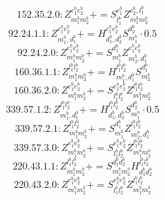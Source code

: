 \documentclass[letterpaper,10pt,fleqn,leqno,onecolumn]{article}
\begin{document}
\begin{equation} \;\;\;\;\;\;  152.35.2.0: Z^{e_{1}^{b}e_{2}^{b}}_{m_{1}^{b}m_{2}^{b}}+=S^{e_{1}^{b}}_{l_{1}^{b}}Z^{e_{2}^{b},l_{1}^{b}}_{m_{1}^{b}m_{2}^{b}} \end{equation}
\begin{equation} \;\;\;\;\;\;  92.24.1.1: Z^{e_{1}^{b}e_{2}^{b}}_{m_{1}^{b},d_{1}^{b}}+=H^{e_{1}^{b}e_{2}^{b}}_{d_{1}^{b},d_{2}^{b}}S^{d_{2}^{b}}_{m_{1}^{b}}\cdot 0.5 \end{equation}
\begin{equation} \;\;\;\;\;\;  92.24.2.0: Z^{e_{1}^{b}e_{2}^{b}}_{m_{1}^{b}m_{2}^{b}}+=S^{d_{1}^{b}}_{m_{1}^{b}}Z^{e_{1}^{b}e_{2}^{b}}_{m_{2}^{b},d_{1}^{b}} \end{equation}
\begin{equation} \;\;\;\;\;\;  160.36.1.1: Z^{l_{1}^{b}l_{2}^{b}}_{m_{1}^{b}m_{2}^{b}}+=H^{l_{1}^{b}l_{2}^{b}}_{m_{1}^{b},d_{1}^{b}}S^{d_{1}^{b}}_{m_{2}^{b}} \end{equation}
\begin{equation} \;\;\;\;\;\;  160.36.2.0: Z^{e_{1}^{b}e_{2}^{b}}_{m_{1}^{b}m_{2}^{b}}+=S^{e_{1}^{b}e_{2}^{b}}_{l_{1}^{b}l_{2}^{b}}Z^{l_{1}^{b}l_{2}^{b}}_{m_{1}^{b}m_{2}^{b}} \end{equation}
\begin{equation} \;\;\;\;\;\;  339.57.1.2: Z^{l_{1}^{b}l_{2}^{b}}_{m_{1}^{b},d_{1}^{b}}+=H^{l_{1}^{b}l_{2}^{b}}_{d_{1}^{b},d_{2}^{b}}S^{d_{2}^{b}}_{m_{1}^{b}}\cdot 0.5 \end{equation}
\begin{equation} \;\;\;\;\;\;  339.57.2.1: Z^{l_{1}^{b}l_{2}^{b}}_{m_{1}^{b}m_{2}^{b}}+=S^{d_{1}^{b}}_{m_{1}^{b}}Z^{l_{1}^{b}l_{2}^{b}}_{m_{2}^{b},d_{1}^{b}} \end{equation}
\begin{equation} \;\;\;\;\;\;  339.57.3.0: Z^{e_{1}^{b}e_{2}^{b}}_{m_{1}^{b}m_{2}^{b}}+=S^{e_{1}^{b}e_{2}^{b}}_{l_{1}^{b}l_{2}^{b}}Z^{l_{1}^{b}l_{2}^{b}}_{m_{1}^{b}m_{2}^{b}} \end{equation}
\begin{equation} \;\;\;\;\;\;  220.43.1.1: Z^{l_{1}^{b}l_{2}^{b}}_{m_{1}^{b}m_{2}^{b}}+=S^{d_{1}^{b}d_{2}^{b}}_{m_{1}^{b}m_{2}^{b}}H^{l_{1}^{b}l_{2}^{b}}_{d_{1}^{b}d_{2}^{b}} \end{equation}
\begin{equation} \;\;\;\;\;\;  220.43.2.0: Z^{e_{1}^{b}e_{2}^{b}}_{m_{1}^{b}m_{2}^{b}}+=S^{e_{1}^{b}e_{2}^{b}}_{l_{1}^{b}l_{2}^{b}}Z^{l_{1}^{b}l_{2}^{b}}_{m_{1}^{b}m_{2}^{b}} \end{equation}
\end{document}
